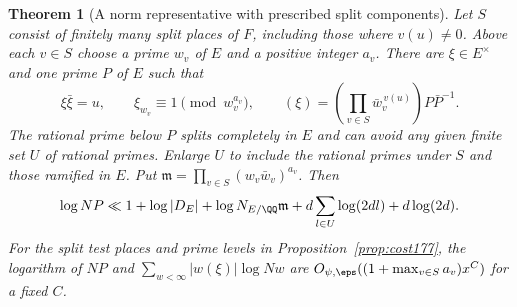 \documentclass[a4paper,11pt]{article}
\newtheorem{theorem}[proposition]{Theorem}
\theoremstyle{definition}
\theoremstyle{remark}
\numberwithin{equation}{section}
\begin{document}
\begin{theorem}[A norm representative with prescribed split components]
\label{thm:norm233}
Let \(S\) consist of finitely many split places of \(F\), including
those where \(v(u)\ne0\). Above each \(v\in S\) choose a prime
\(w_v\) of \(E\) and a positive integer \(a_v\). There are
\(\xi\in E^\times\) and one prime \(P\) of \(E\) such that
\[
  \xi\bar\xi=u,\qquad \xi_{w_v}\equiv1\pmod{w_v^{a_v}},\qquad
  (\xi)=\left(\prod_{v\in S}\bar w_v^{\,v(u)}\right)P\bar P^{-1}.
\]
The rational prime below \(P\) splits completely in \(E\) and can
avoid any given finite set \(U\) of rational primes. Enlarge \(U\)
to include the rational primes under \(S\) and those ramified in
\(E\). Put \(\mathfrak m=\prod_{v\in S}(w_v\bar w_v)^{a_v}\). Then
\[
 \log NP\ll 1+\log|D_E|+\log N_{E/\QQ}\mathfrak m
              +d\sum_{l\in U}\log(2dl)+d\log(2d).
\]
For the split test places and prime levels in Proposition~\ref{prop:cost177}, the logarithm of \(NP\) and
\(\sum_{w<\infty}|w(\xi)|\log Nw\) are
\(O_{\psi,\eps}((1+\max_{v\in S}a_v)x^C)\) for a fixed \(C\).
\end{theorem}
\end{document}
